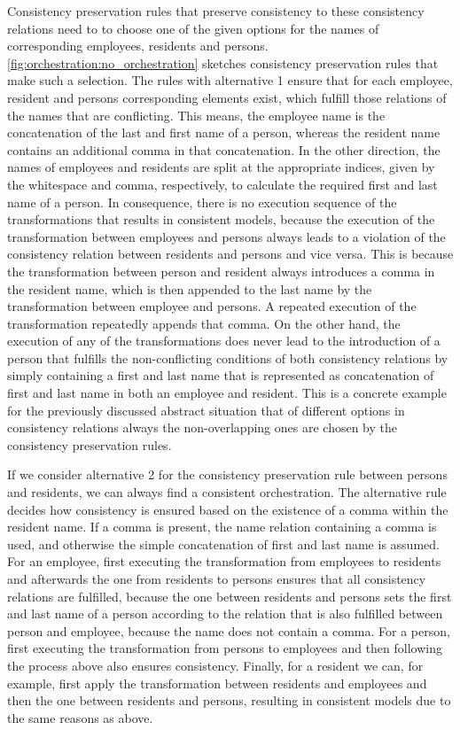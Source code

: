 Consistency preservation rules that preserve consistency to these consistency relations need to to choose one of the given options for the names of corresponding employees, residents and persons.
\autoref{fig:orchestration:no_orchestration} sketches consistency preservation rules that make such a selection.
The rules with alternative 1 ensure that for each employee, resident and persons corresponding elements exist, which fulfill those relations of the names that are conflicting.
This means, the employee name is the concatenation of the last and first name of a person, whereas the resident name contains an additional comma in that concatenation.
In the other direction, the names of employees and residents are split at the appropriate indices, given by the whitespace and comma, respectively, to calculate the required first and last name of a person.
In consequence, there is no execution sequence of the transformations that results in consistent models, because the execution of the transformation between employees and persons always leads to a violation of the consistency relation between residents and persons and vice versa.
This is because the transformation between person and resident always introduces a comma in the resident name, which is then appended to the last name by the transformation between employee and persons.
A repeated execution of the transformation repeatedly appends that comma.
On the other hand, the execution of any of the transformations does never lead to the introduction of a person that fulfills the non-conflicting conditions of both consistency relations by simply containing a first and last name that is represented as concatenation of first and last name in both an employee and resident.
This is a concrete example for the previously discussed abstract situation that of different options in consistency relations always the non-overlapping ones are chosen by the consistency preservation rules.

If we consider alternative 2 for the consistency preservation rule between persons and residents, we can always find a consistent orchestration.
The alternative rule decides how consistency is ensured based on the existence of a comma within the resident name.
If a comma is present, the name relation containing a comma is used, and otherwise the simple concatenation of first and last name is assumed.
For an employee, first executing the transformation from employees to residents and afterwards the one from residents to persons ensures that all consistency relations are fulfilled, because the one between residents and persons sets the first and last name of a person according to the relation that is also fulfilled between person and employee, because the name does not contain a comma.
For a person, first executing the transformation from persons to employees and then following the process above also ensures consistency.
Finally, for a resident we can, for example, first apply the transformation between residents and employees and then the one between residents and persons, resulting in consistent models due to the same reasons as above.

